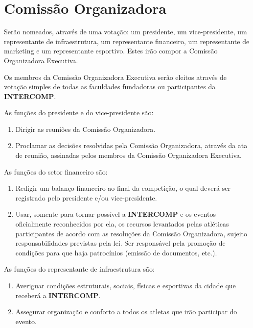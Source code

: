 {\let\clearpage\relax \chapter{Comissão Organizadora}}

\begin{article}
	Serão nomeados, através de uma votação: um presidente, um vice-presidente, um representante de infraestrutura, um representante financeiro, um representante de marketing e um representante esportivo. Estes irão compor a Comissão Organizadora Executiva.
\end{article}

\begin{article}
	Os membros da Comissão Organizadora Executiva serão eleitos através de votação simples de todas as faculdades fundadoras ou participantes da \textbf{INTERCOMP}.

	\begin{xparagraph}
		As funções do presidente e do vice-presidente são:
		\begin{enumerate}[noitemsep]
			\item Dirigir as reuniões da Comissão Organizadora.
			\item Proclamar as decisões resolvidas pela Comissão Organizadora, através da ata de reunião, assinadas pelos membros da Comissão Organizadora Executiva.
		\end{enumerate}
	\end{xparagraph}

	\begin{xparagraph}
		As funções do setor financeiro são:
		\begin{enumerate}[noitemsep]
			\item Redigir um balanço financeiro ao final da competição, o qual deverá ser registrado pelo presidente e/ou vice-presidente.
			\item Usar, somente para tornar possível a \textbf{INTERCOMP} e os eventos oficialmente reconhecidos por ela, os recursos levantados pelas atléticas participantes de acordo com as resoluções da Comissão Organizadora, sujeito responsabilidades previstas pela lei. Ser responsável pela promoção de condições para que haja patrocínios (emissão de documentos, etc.).
		\end{enumerate}
	\end{xparagraph}

	\begin{xparagraph}
		As funções do representante de infraestrutura são:
		\begin{enumerate}[noitemsep]
			\item Averiguar condições estruturais, sociais, físicas e esportivas da cidade que receberá a \textbf{INTERCOMP}.
			\item Assegurar organização e conforto a todos os atletas que irão participar do evento.
		\end{enumerate}
	\end{xparagraph}


\end{article}
